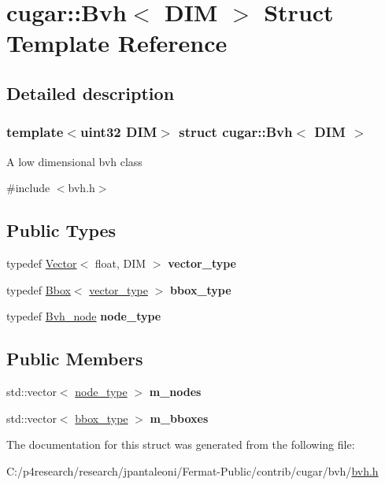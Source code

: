\hypertarget{structcugar_1_1_bvh}{}\section{cugar\+:\+:Bvh$<$ D\+IM $>$ Struct Template Reference}
\label{structcugar_1_1_bvh}


\subsection{Detailed description}
\subsubsection*{template$<$uint32 D\+IM$>$\newline
struct cugar\+::\+Bvh$<$ D\+I\+M $>$}

A low dimensional bvh class 

{\ttfamily \#include $<$bvh.\+h$>$}

\subsection*{Public Types}
\begin{DoxyCompactItemize}
\item 
\mbox{\label{structcugar_1_1_bvh_ac36d42081f829b7cc10171a30d87a765}} 
typedef \hyperlink{structcugar_1_1_vector}{Vector}$<$ float, D\+IM $>$ {\bfseries vector\+\_\+type}
\item 
\mbox{\label{structcugar_1_1_bvh_aeeeaf9bdf55e9af97a3b29b07360c16f}} 
typedef \hyperlink{structcugar_1_1_bbox}{Bbox}$<$ \hyperlink{structcugar_1_1_vector}{vector\+\_\+type} $>$ {\bfseries bbox\+\_\+type}
\item 
\mbox{\label{structcugar_1_1_bvh_a99015aa7a09f3095a53076c3793f4fc9}} 
typedef \hyperlink{structcugar_1_1_bvh__node}{Bvh\+\_\+node} {\bfseries node\+\_\+type}
\end{DoxyCompactItemize}
\subsection*{Public Members}
\begin{DoxyCompactItemize}
\item 
\mbox{\label{structcugar_1_1_bvh_aa4728c4a79768689f4358b149df47120}} 
std\+::vector$<$ \hyperlink{structcugar_1_1_bvh__node}{node\+\_\+type} $>$ {\bfseries m\+\_\+nodes}
\item 
\mbox{\label{structcugar_1_1_bvh_ad25069e53c2f6bf66938df316584162e}} 
std\+::vector$<$ \hyperlink{structcugar_1_1_bbox}{bbox\+\_\+type} $>$ {\bfseries m\+\_\+bboxes}
\end{DoxyCompactItemize}


The documentation for this struct was generated from the following file\+:\begin{DoxyCompactItemize}
\item 
C\+:/p4research/research/jpantaleoni/\+Fermat-\/\+Public/contrib/cugar/bvh/\hyperlink{bvh_8h}{bvh.\+h}\end{DoxyCompactItemize}
